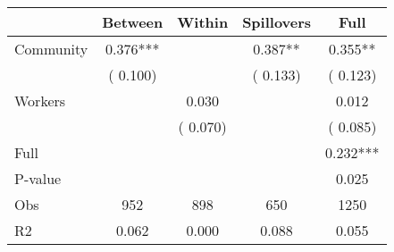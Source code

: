 
\begin{tabular}{l*{4}{c}}\hline&\multicolumn{1}{c}{Between}&\multicolumn{1}{c}{Within}&\multicolumn{1}{c}{Spillovers}&\multicolumn{1}{c}{Full}\\ \hline
 Community             &              0.376***      &                                               &        0.387** &         0.355**                            \\ 
                               &        (       0.100)           &                                       &       (       0.133)     &      (       0.123)                                           \\ 
 Workers       &                                               &        0.030    &                                &             0.012                            \\ 
                               &                                               & (       0.070)                  &                                        &      (       0.085)                                           \\ 
\hline                                                                                                                                                                                                                                            
 Full                  &                                               &                                               &                                        &             0.232***                                     \\ 
 P-value               &                                               &                                               &                                        &             0.025                                           \\ 
 Obs                   &               952               &       898                       &       650                &              1250                                               \\ 
 R2                    &                      0.062              &              0.000                      &              0.088               &                     0.055                                              \\ 
\hline \end{tabular}                                                                                                                                                                                                              